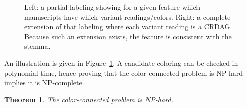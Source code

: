 \documentclass{tlp}
\renewcommand{\|}{\ensuremath{\,|\,}}
\newtheorem{theorem}{Theorem}
\renewcommand{\|}{\,|\,}
\begin{document}
\begin{figure}
\caption{Left: a partial labeling showing for a given feature which
  manuscripts have which variant readings/colors.  Right: a
  complete extension of that labeling where each variant reading is a CRDAG.
  Because such an extension exists, the feature is consistent with
  the stemma.}
\label{fig:colorings}
\end{figure}



An illustration is given in Figure~\ref{fig:colorings}.
A candidate coloring can be checked in polynomial time, hence proving
that the color-connected  problem is NP-hard implies it is NP-complete.

\begin{theorem}
The color-connected  problem is NP-hard.
\end{theorem}
\end{document}

